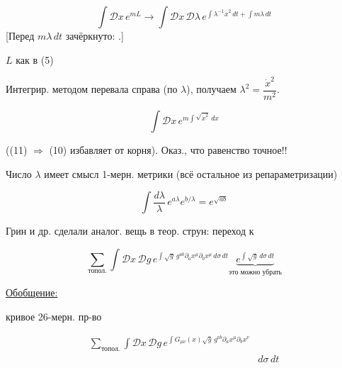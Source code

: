 
\begin{equation*}
\int \mathcal{D}x\,e^{mL}
\longrightarrow
\int \mathcal{D}x\,\mathcal{D}\lambda\,
e^{\int \lambda^{-1}\dot{x}^{2}\,dt+\int m\lambda\,dt}
\tag{10}
\end{equation*}
[Перед $m\lambda\,dt$ зачёркнуто:
.]

$L$ как в (5)

Интегрир. методом перевала справа (по $\lambda$), получаем
$\lambda^{2}=\dfrac{\dot{x}^{2}}{m^{2}}$.

\begin{equation*}
\int \mathcal{D}x\,e^{m\int\sqrt{\dot{x}^{2}}\,dx}
\tag{11}
\end{equation*}

((11) $\Rightarrow$ (10) избавляет от корня). Оказ., что равенство точное!!

Число $\lambda$ имеет смысл 1-мерн. метрики
(всё остальное 
из репараметризации)

\begin{equation*}
\int\frac{d\lambda}{\lambda}\,e^{a\lambda}e^{b/\lambda}
=e^{\sqrt{ab}}
\tag{12}
\end{equation*}

Грин и др. сделали аналог. вещь в теор. струн: переход к

\begin{equation*}
\sum_{\text{топол.}}\int\mathcal{D}x\,\mathcal{D}g\,
e^{\int\sqrt{g}\,g^{ab}\partial_a x^{\mu}\partial_b x^{\mu}\,d\sigma\,dt}
\underbrace{e^{\int\sqrt{g}\,d\sigma\,dt}}_{\text{это можно убрать}}
\tag{13}
\end{equation*}

\underline{Обобщение:}

кривое 26-мерн. пр-во

\begin{equation*}
\begin{aligned}
\sum_{\text{топол.}}\int\mathcal{D}x\,\mathcal{D}g\,
e^{\int G_{\mu\nu}(x)\sqrt{g}\,g^{ab}\partial_a x^{\mu}\partial_b x^{\nu}}
&{}\\
&d\sigma\,dt
\end{aligned}
\tag{14}
\end{equation*}

